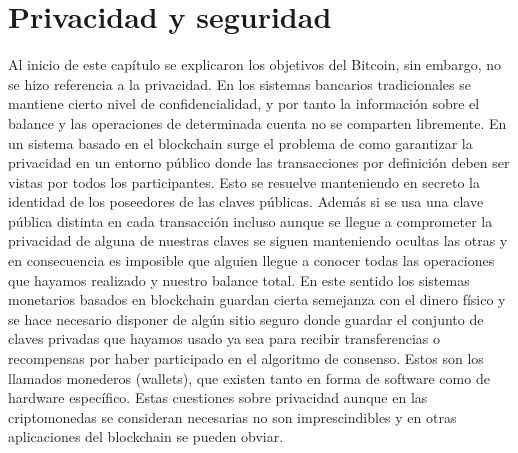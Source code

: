 

\section{Privacidad y seguridad}\label{cap3:seguridad} %
Al inicio de este capítulo se explicaron los objetivos del Bitcoin, sin embargo, no se hizo referencia a la privacidad. En los sistemas bancarios tradicionales se mantiene cierto nivel de confidencialidad, y por tanto la información sobre el balance y las operaciones de determinada cuenta no se comparten libremente. En un sistema basado en el blockchain surge el problema de como garantizar la privacidad en un entorno público donde las transacciones por definición deben ser vistas por todos los participantes. Esto se resuelve manteniendo en secreto la identidad de los poseedores de las  claves públicas. Además si se usa una clave pública distinta en cada transacción incluso aunque se llegue a comprometer la privacidad de alguna de nuestras claves se siguen manteniendo ocultas las otras y en consecuencia es imposible que alguien llegue a conocer todas las operaciones que hayamos realizado y nuestro balance total. En este sentido los sistemas monetarios basados en blockchain guardan cierta semejanza con el dinero físico y se hace necesario disponer de algún sitio seguro donde guardar el conjunto de claves privadas que hayamos usado ya sea para recibir transferencias o recompensas por haber participado en el algoritmo de consenso. Estos son los llamados monederos (wallets), que existen tanto en forma de software como de hardware específico.
Estas cuestiones sobre privacidad aunque en las criptomonedas se consideran necesarias no son imprescindibles y en otras aplicaciones del blockchain se pueden obviar.


